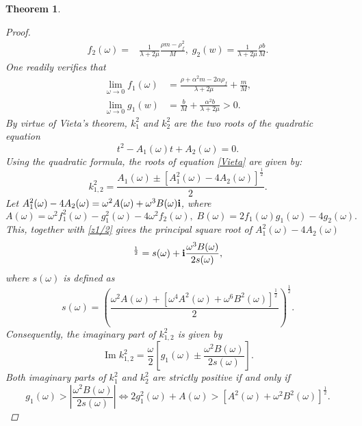 \documentclass[11pt]{article}
\newcommand{\ds}{\displaystyle}
\newcommand{\om}{\omega}
\newcommand{\la}{\lambda}
\newtheorem{theorem}{Theorem}[section]
\providecommand{\Ip}{\operatorname{Im}}%
\begin{document}
\begin{theorem}
\begin{proof}
\begin{equation}
\begin{aligned}
f_2(\omega)=&\frac{1}{\la+2\mu}\frac{\rho m-\rho_f^2}{M},\;
g_2(w)=\frac{1}{\la+2\mu}\frac{\rho b }{M}.
\end{aligned}
\end{equation}
One readily verifies that
\begin{equation}\label{lim_f1g1}
\begin{aligned}
\ds\lim_{\omega \to 0}f_1(\omega)&=\frac{\rho+\alpha^2m-2\alpha \rho_f}{\la+2\mu} + \frac{m}{M},\\
\ds\lim_{\omega \to 0}g_1(w)&=\frac{ b}{M}
+\frac{\alpha^2 b}{\la+2\mu}>0.
\end{aligned}
\end{equation}
By virtue of Vieta's theorem, $k_1^2$ and $k_2^2$ are the two roots of the quadratic equation
\begin{equation}\label{Vieta}
t^2-A_1(\omega)t+A_2(\omega)=0.
\end{equation}
Using the quadratic formula, the roots of equation \eqref{Vieta} are given by:
\begin{equation*}
k_{1,2}^2=\frac{A_1(\omega)\pm[A_1^2(\omega)-4A_2(\omega)]^{\frac{1}{2}}}{2}.
\end{equation*}
Let $A_1^2(\omega)-4A_2(\omega)=\omega^2A(\omega)+\omega^3B(\omega){\bf{i}}$, where
\begin{equation}\label{AB}
A(\omega)=\omega^2f_1^2(\omega)-g_1^2(\omega)-4\omega^2f_2(\omega),\;
B(\omega)=2f_1(\omega)g_1(\omega)-4g_2(\omega).
\end{equation}
This, together with \eqref{z1/2} gives the principal square root of $A_1^2(\omega)-4A_2(\omega)$
\begin{equation}
[A_1^2(\omega)-4A_2(\omega)]^{\frac{1}{2}} = s(\om) + {\bf i}\frac{\om^3B(\om)}{2s(\om)},
\end{equation}
where $s(\om)$ is defined as
\begin{equation*}
s(\om)=\left(\frac{\omega^2A(\omega)+\left[\omega^4A^2(\omega)+\omega^6B^2(\omega)\right]
^{\frac{1}{2}}}{2}\right)^{\frac{1}{2}}.
\end{equation*}
Consequently, the imaginary part of $k_{1,2}^2$ is given by 
$$\Ip k_{1,2}^2 = \ds\frac{\om}{2}\left[g_1(\om)\pm\frac{\om^2B(\om)}{2s(\om)}\right].$$
Both imaginary parts of $k_1^2$ and $k_2^2$ are strictly positive if and only if 
\begin{equation}\label{equav_rela}
g_1(\omega) > \left| \ds\frac{\omega^2 B(\omega)}{2s(\omega)} \right| \Longleftrightarrow  
2g_1^2(\omega) + A(\omega) > [A^2(\omega) + \omega^2 B^2(\omega)]^{\frac{1}{2}}.
\end{equation}

\end{proof}
\end{theorem}
\end{document}
